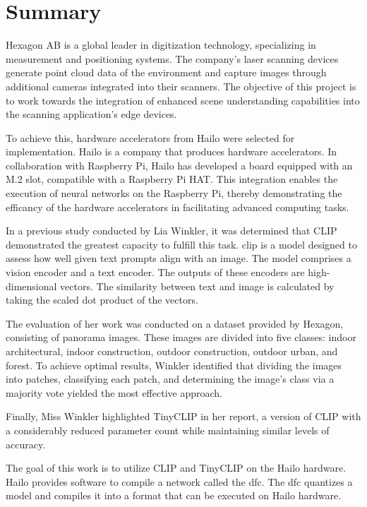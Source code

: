\chapter*{Summary}
Hexagon AB is a global leader in digitization technology, specializing in measurement and positioning systems.  
The company's laser scanning devices generate point cloud data of the environment and capture images through additional cameras integrated into their scanners.  
The objective of this project is to work towards the integration of enhanced scene understanding capabilities into the scanning application's edge devices.  

To achieve this, hardware accelerators from Hailo were selected for implementation.  
Hailo is a company that produces hardware accelerators.  
In collaboration with Raspberry Pi, Hailo has developed a board equipped with an M.2 slot, compatible with a Raspberry Pi HAT.  
This integration enables the execution of neural networks on the Raspberry Pi, thereby demonstrating the efficancy of the hardware accelerators in facilitating advanced computing tasks.  

In a previous study conducted by Lia Winkler, it was determined that CLIP demonstrated the greatest capacity to fulfill this task.  
\acrfull{clip} is a model designed to assess how well given text prompts align with an image.  
The model comprises a vision encoder and a text encoder.  
The outputs of these encoders are high-dimensional vectors.  
The similarity between text and image is calculated by taking the scaled dot product of the vectors.  

The evaluation of her work was conducted on a dataset provided by Hexagon, consisting of panorama images.  
These images are divided into five classes: indoor architectural, indoor construction, outdoor construction, outdoor urban, and forest.  
To achieve optimal results, Winkler identified that dividing the images into patches, classifying each patch, and determining the image's class via a majority vote yielded the most effective approach.  

Finally, Miss Winkler highlighted TinyCLIP in her report, a version of CLIP with a considerably reduced parameter count while maintaining similar levels of accuracy.  

The goal of this work is to utilize CLIP and TinyCLIP on the Hailo hardware.  
Hailo provides software to compile a network called the \acrfull{dfc}.  
The \acrshort{dfc} quantizes a model and compiles it into a format that can be executed on Hailo hardware.  


